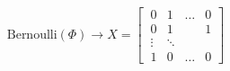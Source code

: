 \documentclass[preview]{standalone}
\begin{document}
\begin{align*}
\text{Bernoulli}(\Phi) \longrightarrow X = \begin{bmatrix}\
                      0 & 1 & \dots & 0 \\\
                      0 & 1 &       & 1 \\\
                      \vdots & \ddots\\\
                      1 & 0 & \dots & 0  \end{bmatrix}
\end{align*}
\end{document}
